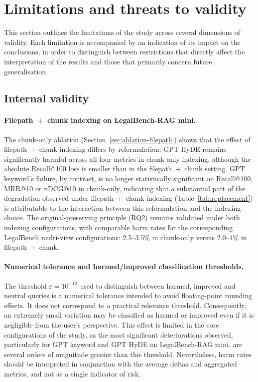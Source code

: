 \documentclass[a4paper,fleqn]{cas-dc}
\begin{document}
\section{Limitations and threats to validity}
\label{sec:limitations}
This section outlines the limitations of the study across
several dimensions of validity. Each limitation is
accompanied by an indication of its impact on the
conclusions, in order to distinguish between restrictions that
directly affect the interpretation of the results
and those that primarily concern future generalisation.
\subsection{Internal validity}
\paragraph{Filepath~+~chunk indexing on
LegalBench-RAG mini.}
The chunk-only ablation
(Section~\ref{sec:ablation-filepath}) shows that the
effect of filepath~+~chunk indexing differs by
reformulation. GPT HyDE remains significantly harmful
across all four metrics in chunk-only indexing, although
the absolute Recall@100 loss is smaller than in the
filepath~+~chunk setting. GPT keyword's failure, by
contrast, is no longer statistically significant on
Recall@100, MRR@10 or nDCG@10 in chunk-only, indicating
that a substantial part of the degradation observed under
filepath~+~chunk indexing (Table~\ref{tab:replacement})
is attributable to the interaction between this
reformulation and the indexing choice. The
original-preserving principle (RQ2) remains validated
under both indexing configurations, with comparable harm
rates for the corresponding LegalBench multi-view
configurations: 2.5--3.5\% in chunk-only versus
2.0--4\% in filepath~+~chunk.
\paragraph{Numerical tolerance and
harmed/improved classification thresholds.}
The threshold $\varepsilon = 10^{-12}$ used to
distinguish between harmed, improved and neutral queries is
a numerical tolerance intended to avoid
floating-point rounding effects. It does not correspond to
a practical relevance threshold. Consequently, an
extremely small variation may be classified as
harmed or improved even if it is negligible from the
user’s perspective.
This effect is limited in the core
configurations of the study, as the most significant
deteriorations observed, particularly for GPT keyword and GPT HyDE on
LegalBench-RAG mini, are several orders of
magnitude greater than this threshold. Nevertheless, harm
rates should be interpreted in conjunction with the
average deltas and aggregated metrics, and not as
a single indicator of risk.
\end{document}
